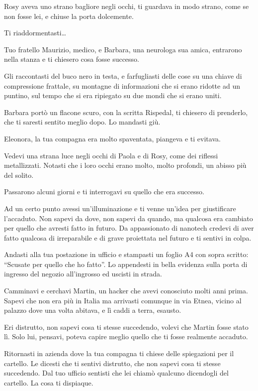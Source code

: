 Rosy aveva uno strano bagliore negli occhi, ti guardava in modo strano, come se non fosse lei, e chiuse la porta dolcemente.

Ti riaddormentasti\ldots

Tuo fratello Maurizio, medico, e Barbara, una neurologa sua amica, entrarono nella stanza e ti chiesero cosa fosse successo.

Gli raccontasti del buco nero in testa, e farfugliasti delle cose su una chiave di compressione frattale, su montagne di informazioni che si erano ridotte ad un puntino, sul tempo che si era ripiegato su due mondi che si erano uniti.

Barbara portò un flacone scuro, con la scritta Rispedal, ti chiesero di prenderlo, che ti saresti sentito meglio dopo. Lo mandasti giù.

Eleonora, la tua compagna era molto spaventata, piangeva e ti evitava.

Vedevi una strana luce negli occhi di Paola e di Rosy, come dei riflessi metallizzati. Notasti che i loro occhi erano molto, molto profondi, un abisso più del solito.

Passarono alcuni giorni e ti interrogavi su quello che era successo.

Ad un certo punto avessi un'illuminazione e ti venne un'idea per giustificare l'accaduto. Non sapevi da dove, non sapevi da quando, ma qualcosa era cambiato per quello che avresti fatto in futuro. Da appassionato di nanotech credevi di aver fatto qualcosa di irreparabile e di grave proiettata nel futuro e ti sentivi in colpa.

Andasti alla tua postazione in ufficio e stampasti un foglio A4 con sopra scritto: “Scusate per quello che ho fatto”. Lo appendesti in bella evidenza sulla porta di ingresso del negozio all'ingrosso ed uscisti in strada.

Camminavi e cerchavi Martin, un hacker che avevi conosciuto molti anni prima. Sapevi che non era più in Italia ma arrivasti comunque in via Etnea, vicino al palazzo dove una volta abitava, e lì caddi a terra, esausto.

Eri distrutto, non sapevi cosa ti stesse succedendo, volevi che Martin fosse stato lì. Solo lui, pensavi, poteva capire meglio quello che ti fosse realmente accaduto.

Ritornasti in azienda dove la tua compagna ti chiese delle spiegazioni per il cartello. Le dicesti che ti sentivi distrutto, che non sapevi cosa ti stesse succedendo. Dal tuo ufficio sentisti che lei chiamò qualcuno dicendogli del cartello. La cosa ti dispiaque.

